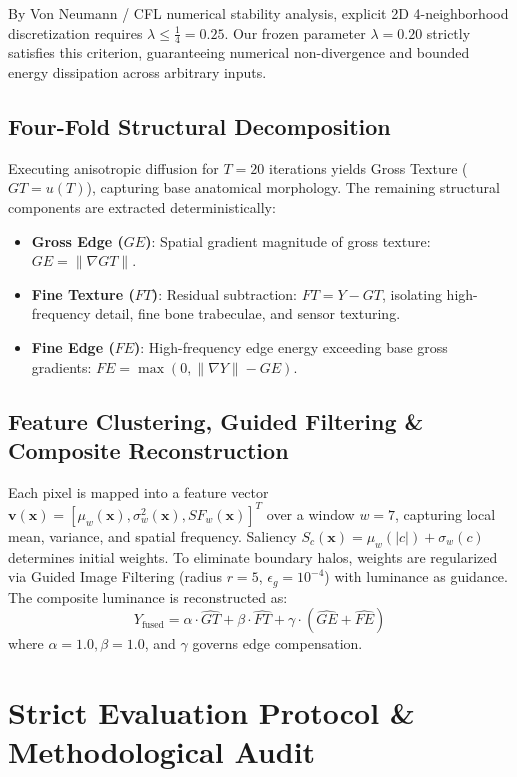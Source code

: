 \documentclass[conference]{IEEEtran}
\begin{document}
By Von Neumann / CFL numerical stability analysis, explicit 2D 4-neighborhood discretization requires $\lambda \le \frac{1}{4} = 0.25$. Our frozen parameter $\lambda = 0.20$ strictly satisfies this criterion, guaranteeing numerical non-divergence and bounded energy dissipation across arbitrary inputs.

\subsection{Four-Fold Structural Decomposition}
Executing anisotropic diffusion for $T = 20$ iterations yields Gross Texture ($GT = u(T)$), capturing base anatomical morphology. The remaining structural components are extracted deterministically:
\begin{itemize}
    \item \textbf{Gross Edge ($GE$)}: Spatial gradient magnitude of gross texture: $GE = \|\nabla GT\|$.
    \item \textbf{Fine Texture ($FT$)}: Residual subtraction: $FT = Y - GT$, isolating high-frequency detail, fine bone trabeculae, and sensor texturing.
    \item \textbf{Fine Edge ($FE$)}: High-frequency edge energy exceeding base gross gradients: $FE = \max(0, \|\nabla Y\| - GE)$.
\end{itemize}

\subsection{Feature Clustering, Guided Filtering \& Composite Reconstruction}
Each pixel is mapped into a feature vector $\mathbf{v}(\mathbf{x}) = [\mu_w(\mathbf{x}), \sigma_w^2(\mathbf{x}), SF_w(\mathbf{x})]^T$ over a window $w = 7$, capturing local mean, variance, and spatial frequency. Saliency $S_c(\mathbf{x}) = \mu_w(|c|) + \sigma_w(c)$ determines initial weights. To eliminate boundary halos, weights are regularized via Guided Image Filtering (radius $r = 5$, $\epsilon_g = 10^{-4}$) with luminance as guidance. The composite luminance is reconstructed as:
\begin{equation}
Y_{\text{fused}} = \alpha \cdot \widehat{GT} + \beta \cdot \widehat{FT} + \gamma \cdot (\widehat{GE} + \widehat{FE})
\end{equation}
where $\alpha = 1.0, \beta = 1.0$, and $\gamma$ governs edge compensation.

\section{Strict Evaluation Protocol \& Methodological Audit}
\end{document}
